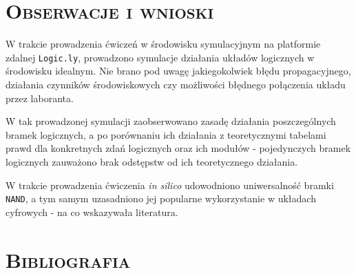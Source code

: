 \documentclass[,a4paper,12pt]{article}
\begin{document}
\section{\textsc{Obserwacje i wnioski}}
W trakcie prowadzenia ćwiczeń w środowisku symulacyjnym na platformie zdalnej \texttt{Logic.ly}, prowadzono symulacje działania układów logicznych w środowisku idealnym. Nie brano pod uwagę jakiegokolwiek błędu propagacyjnego, działania czynników środowiskowych czy możliwości błędnego połączenia układu przez laboranta.\\ \par
W tak prowadzonej symulacji zaobserwowano zasadę działania poszczególnych bramek logicznych, a po porównaniu ich działania z teoretycznymi tabelami prawd dla konkretnych zdań logicznych oraz ich modułów - pojedynczych bramek logicznych zauważono brak odstępstw od ich teoretycznego działania. \\ \par 
W trakcie prowadzenia ćwiczenia \textit{in silico} udowodniono uniwersalność bramki \texttt{NAND}, a tym samym uzasadniono jej popularne wykorzystanie w układach cyfrowych - na co wskazywała literatura. 

\section{\textsc{Bibliografia}}
\printbibliography[heading=none]
\end{document}
